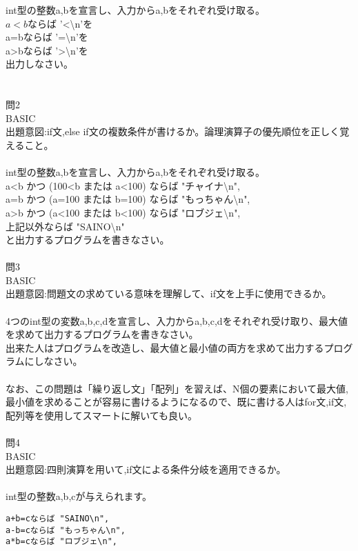 \documentclass[a4j,titlepage,dvipdfmx]{jsarticle}   %
\begin{document}
int型の整数a,bを宣言し、入力からa,bをそれぞれ受け取る。\\
$a<b$ならば '<\textbackslash n'を\\
a=bならば '=\textbackslash n'を\\
a>bならば '>\textbackslash n'を\\
出力しなさい。\\
\\
\\
問2\\
BASIC\\
出題意図:if文,else if文の複数条件が書けるか。論理演算子の優先順位を正しく覚えること。\\
\\
int型の整数a,bを宣言し、入力からa,bをそれぞれ受け取る。\\
a<b かつ (100<b または a<100) 	ならば "チャイナ\textbackslash n",\\
a=b かつ (a=100 または b=100) 	ならば "もっちゃん\textbackslash n",\\
a>b かつ (a<100 または b<100) 	ならば "ロブジェ\textbackslash n",\\
上記以外ならば "SAINO\textbackslash n"\\
と出力するプログラムを書きなさい。\\
\\
問3\\
BASIC\\
出題意図:問題文の求めている意味を理解して、if文を上手に使用できるか。\\
\\
4つのint型の変数a,b,c,dを宣言し、入力からa,b,c,dをそれぞれ受け取り、最大値を求めて出力するプログラムを書きなさい。\\
出来た人はプログラムを改造し、最大値と最小値の両方を求めて出力するプログラムにしなさい。\\
\\
なお、この問題は「繰り返し文」「配列」を習えば、N個の要素において最大値,最小値を求めることが容易に書けるようになるので、既に書ける人はfor文,if文,配列等を使用してスマートに解いても良い。\\
\\
問4\\
BASIC\\
出題意図:四則演算を用いて,if文による条件分岐を適用できるか。\\
\\
int型の整数a,b,cが与えられます。\\
\begin{verbatim}
a+b=cならば "SAINO\n",
a-b=cならば "もっちゃん\n",
a*b=cならば "ロブジェ\n",
\end{verbatim}
\end{document}
